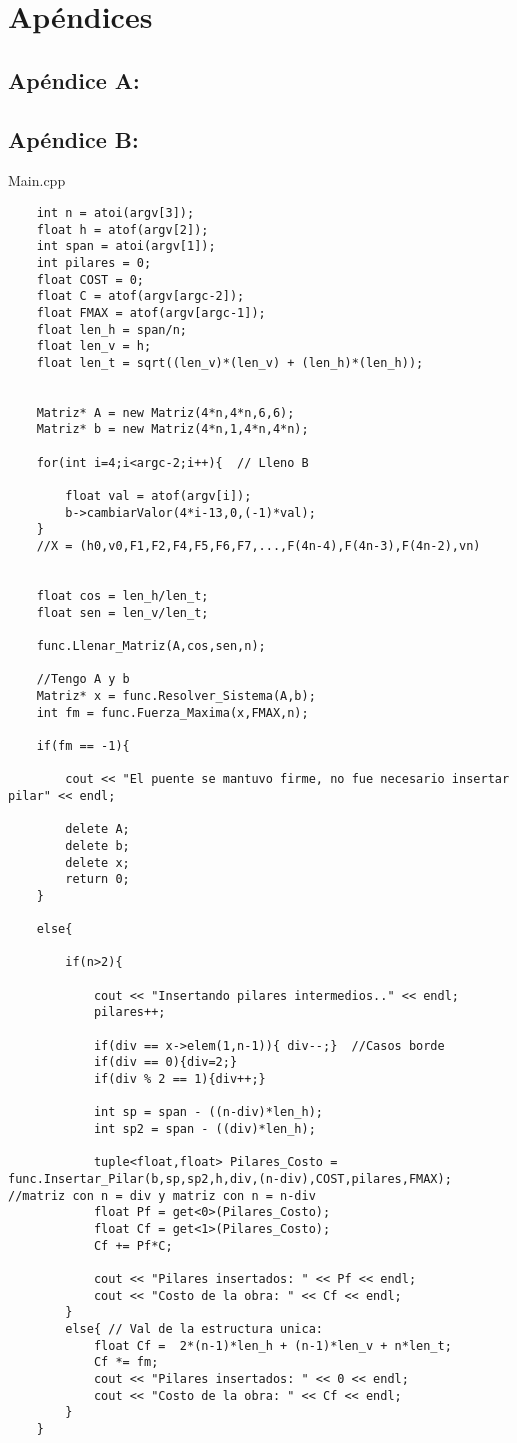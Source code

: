 \section{Ap\'endices}

\subsection{Ap\'endice A:}

 \newpage

\subsection{Ap\'endice B:}

{\Large Main.cpp}
\belowcaptionskip=-10pt
\lstset{framesep=10pt}
\begin{lstlisting}
	int n = atoi(argv[3]);
	float h = atof(argv[2]);
	int span = atoi(argv[1]);
	int pilares = 0;
	float COST = 0;
	float C = atof(argv[argc-2]);
	float FMAX = atof(argv[argc-1]);
	float len_h = span/n;
	float len_v = h;
	float len_t = sqrt((len_v)*(len_v) + (len_h)*(len_h));
	
	
	Matriz* A = new Matriz(4*n,4*n,6,6);  
	Matriz* b = new Matriz(4*n,1,4*n,4*n);
  
    for(int i=4;i<argc-2;i++){	// Lleno B
	
		float val = atof(argv[i]);
		b->cambiarValor(4*i-13,0,(-1)*val);	
	}
	//X = (h0,v0,F1,F2,F4,F5,F6,F7,...,F(4n-4),F(4n-3),F(4n-2),vn)
	
	
	float cos = len_h/len_t;
	float sen = len_v/len_t;		
	
	func.Llenar_Matriz(A,cos,sen,n);
	
	//Tengo A y b
	Matriz* x = func.Resolver_Sistema(A,b);	
	int fm = func.Fuerza_Maxima(x,FMAX,n);
	
	if(fm == -1){
		
		cout << "El puente se mantuvo firme, no fue necesario insertar pilar" << endl;	
	
		delete A;
		delete b;
		delete x;
		return 0;	
	}
	
	else{
		
		if(n>2){
		
			cout << "Insertando pilares intermedios.." << endl;					
			pilares++;
		
			if(div == x->elem(1,n-1)){ div--;}	//Casos borde
			if(div == 0){div=2;}
			if(div % 2 == 1){div++;}
			
			int sp = span - ((n-div)*len_h);
			int sp2 = span - ((div)*len_h);
			
			tuple<float,float> Pilares_Costo = func.Insertar_Pilar(b,sp,sp2,h,div,(n-div),COST,pilares,FMAX);	 //matriz con n = div y matriz con n = n-div 
			float Pf = get<0>(Pilares_Costo);
			float Cf = get<1>(Pilares_Costo);
			Cf += Pf*C;
		
			cout << "Pilares insertados: " << Pf << endl;
			cout << "Costo de la obra: " << Cf << endl;
		}
		else{ // Val de la estructura unica:
			float Cf =  2*(n-1)*len_h + (n-1)*len_v + n*len_t;
			Cf *= fm;
			cout << "Pilares insertados: " << 0 << endl;
			cout << "Costo de la obra: " << Cf << endl;
		}
	}
	

\end{lstlisting}

